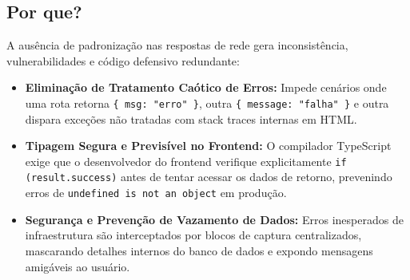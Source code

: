 \documentclass[12pt,a4paper]{article}
\begin{document}
\subsection{Por que?}
A ausência de padronização nas respostas de rede gera inconsistência, vulnerabilidades e código defensivo redundante:
\begin{itemize}
  \item \textbf{Eliminação de Tratamento Caótico de Erros:} Impede cenários onde uma rota retorna \texttt{\{ msg: "erro" \}}, outra \texttt{\{ message: "falha" \}} e outra dispara exceções não tratadas com stack traces internas em HTML.
  \item \textbf{Tipagem Segura e Previsível no Frontend:} O compilador TypeScript exige que o desenvolvedor do frontend verifique explicitamente \texttt{if (result.success)} antes de tentar acessar os dados de retorno, prevenindo erros de \texttt{undefined is not an object} em produção.
  \item \textbf{Segurança e Prevenção de Vazamento de Dados:} Erros inesperados de infraestrutura são interceptados por blocos de captura centralizados, mascarando detalhes internos do banco de dados e expondo mensagens amigáveis ao usuário.
\end{itemize}
\end{document}
